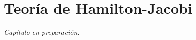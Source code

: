 \documentclass[../apunte_mecanica_clasica.tex]{subfiles}%
\begin{document}
\chapter{Teoría de Hamilton-Jacobi}


\begin{center}
\vspace{1cm}
\textit{Capítulo en preparación.}
\end{center}
\end{document}
